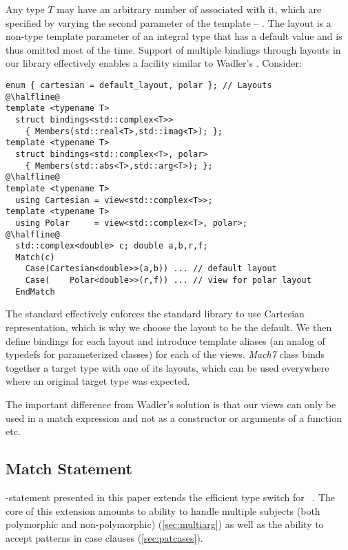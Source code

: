 Any type $T$ may have an arbitrary number of  associated with it, 
which are specified by varying the second parameter of the  
template -- . The layout is a non-type template parameter of an 
integral type that has a default value and is thus omitted most of the time.
Support of multiple bindings through layouts in our library effectively enables 
a facility similar to Wadler's \cite{Wadler87}. Consider:

\begin{lstlisting}
enum { cartesian = default_layout, polar }; // Layouts
@\halfline@
template <typename T> 
  struct bindings<std::complex<T>>
    { Members(std::real<T>,std::imag<T>); };
template <typename T> 
  struct bindings<std::complex<T>, polar>
    { Members(std::abs<T>,std::arg<T>); };
@\halfline@
template <typename T> 
  using Cartesian = view<std::complex<T>>;
template <typename T> 
  using Polar     = view<std::complex<T>, polar>;
@\halfline@
  std::complex<double> c; double a,b,r,f;
  Match(c)
    Case(Cartesian<double>>(a,b)) ... // default layout
    Case(    Polar<double>>(r,f)) ... // view for polar layout
  EndMatch
\end{lstlisting}

\noindent
The \Cpp{} standard effectively enforces the standard library to use Cartesian 
representation\cite[-4]{C++11}, which is why we choose the 
 layout to be the default. We then define bindings for each 
layout and introduce template aliases (an analog of typedefs for parameterized 
classes) for each of the views. \emph{Mach7} class  binds together a 
target type with one of its layouts, which can be used everywhere where an 
original target type was expected.

The important difference from Wadler's solution is that our views can only be 
used in a match expression and not as a constructor or arguments of a function 
etc.

\subsection{Match Statement}
\label{sec:matchstmt}

-statement presented in this paper extends the efficient type switch 
for \Cpp{}~\cite{TS12}. The core of this extension amounts to ability to handle 
multiple subjects (both polymorphic and non-polymorphic) 
(\textsection\ref{sec:multiarg}) as well as the ability to accept patterns in 
case clauses (\textsection\ref{sec:patcases}).

